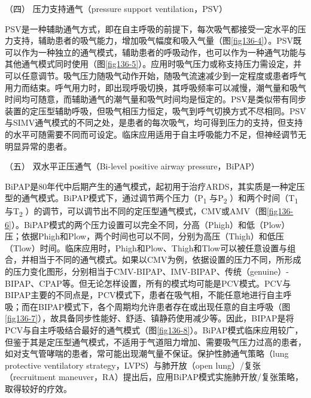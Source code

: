 \hypertarget{text00368.htmlux5cux23CHP16-3-2-1-4}{}
（四） 压力支持通气（pressure support ventilation，PSV）

PSV是一种辅助通气方式，即在自主呼吸的前提下，每次吸气都接受一定水平的压力支持，辅助患者的吸气能力，增加吸气幅度和吸入气量（图\ref{fig136-4}）。PSV既可以作为一种独立的通气模式，辅助患者的呼吸动作，也可以作为一种通气功能与其他通气模式同时使用（图\ref{fig136-5}）。应用时吸气压力或称支持压力需设定，并可以任意调节。吸气压力随吸气动作开始，随吸气流速减少到一定程度或患者呼气用力而结束。呼气用力时，即出现呼吸切换，其呼吸频率可以减慢，潮气量和吸气时间均可随意，而辅助通气的潮气量和吸气时间均是恒定的。PSV是类似带有同步装置的定压型辅助呼吸，但吸气相压力恒定，吸气到呼气切换方式不尽相同。PSV与SIMV通气模式的不同之处，是患者的每次吸气，均可得到压力的支持，但支持的水平可随需要不同而可设定。临床应用适用于自主呼吸能力不足，但神经调节无明显异常的患者。

\hypertarget{text00368.htmlux5cux23CHP16-3-2-1-5}{}
（五） 双水平正压通气（Bi-level positive airway pressure，BiPAP）

BiPAP是80年代中后期产生的通气模式，起初用于治疗ARDS，其实质是一种定压型的通气模式。BiPAP模式下，通过调节两个压力（P\textsubscript{1}
与P\textsubscript{2} ）和两个时间（T\textsubscript{1}
与T\textsubscript{2}
）的调节，可以调节出不同的定压型通气模式，CMV或AMV（图\ref{fig136-6}）。BiPAP模式的两个压力设置可以完全不同，分高（Phigh）和低（Plow）压；依据Phigh和Plow，两个时间也可以不同，分别为高压（Thigh）和低压（Tlow）时间。临床应用时，Phigh和Plow、Thigh和Tlow可以被任意设置与组合，并相当于不同的通气模式。如果以CMV为例，依据设置的压力不同，所形成的压力变化图形，分别相当于CMV-BIPAP、IMV-BIPAP、传统（genuine）-BIPAP、CPAP等。但无论怎样设置，所有的模式均可能是PCV模式。PCV与BIPAP主要的不同点是，PCV模式下，患者在吸气相，不能任意地进行自主呼吸；而在BIPAP模式下，各个周期均允许患者存在或出现任意的自主呼吸（图\ref{fig136-7}），故具备同步性能好、舒适、镇静药使用减少等。因此，BIPAP是将PCV与自主呼吸结合最好的通气模式（图\ref{fig136-8}）。BiPAP模式临床应用较广，但鉴于其是定压型通气模式，不适用于气道阻力增加、需要吸气压力过高的患者，如对支气管哮喘的患者，常可能出现潮气量不保证。保护性肺通气策略（lung
protective ventilatory strategy，LVPS）与肺开放（open
lung）/复张（recruitment
maneuver，RA）提出后，应用BiPAP模式实施肺开放/复张策略，取得较好的疗效。

